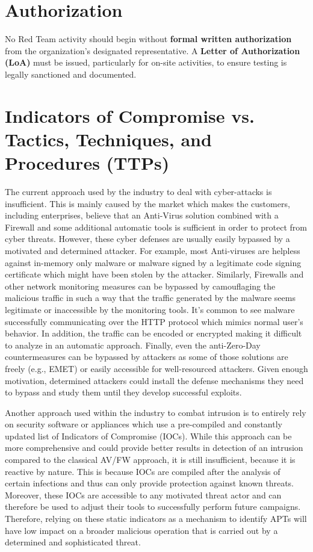 \section{Authorization}
No Red Team activity should begin without \textbf{formal written authorization} from the organization’s designated representative. A \textbf{Letter of Authorization (LoA)} must be issued, particularly for on-site activities, to ensure testing is legally sanctioned and documented.

\section{Indicators of Compromise vs. Tactics, Techniques, and Procedures (TTPs)}
The current approach used by the industry to deal with cyber-attacks is insufficient. This is mainly caused by the market which makes the customers, including enterprises, believe that an Anti-Virus solution combined with a Firewall and some additional automatic tools is sufficient in order to protect from cyber threats. However, these cyber defenses are usually easily bypassed by a motivated and determined attacker. For example, most Anti-viruses are helpless against in-memory only malware or malware signed by a legitimate code signing certificate which might have been stolen by the attacker. Similarly, Firewalls and other network monitoring measures can be bypassed by camouflaging the malicious traffic in such a way that the traffic generated by the malware seems legitimate or inaccessible by the monitoring tools. It’s common to see malware successfully communicating over the HTTP protocol which mimics normal user’s behavior. In addition, the traffic can be encoded or encrypted making it difficult to analyze in an automatic approach. Finally, even the anti-Zero-Day countermeasures can be bypassed by attackers as some of those solutions are freely (e.g., EMET) or easily accessible for well-resourced attackers. Given enough motivation, determined attackers could install the defense mechanisms they need to bypass and study them until they develop successful exploits.

Another approach used within the industry to combat intrusion is to entirely rely on security software or appliances which use a pre-compiled and constantly updated list of Indicators of Compromise (IOCs). While this approach can be more comprehensive and could provide better results in detection of an intrusion compared to the classical AV/FW approach, it is still insufficient, because it is reactive by nature. This is because IOCs are compiled after the analysis of certain infections and thus can only provide protection against known threats. Moreover, these IOCs are accessible to any motivated threat actor and can therefore be used to adjust their tools to successfully perform future campaigns. Therefore, relying on these static indicators as a mechanism to identify APTs will have low impact on a broader malicious operation that is carried out by a determined and sophisticated threat.

